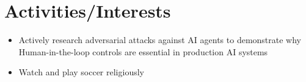 \documentclass[letterpaper,11pt]{article}
\newcommand{\resumeSubHeadingListStart}{\begin{itemize}[leftmargin=*]}
\newcommand{\resumeSubHeadingListEnd}{\end{itemize}}
\begin{document}
\section{Activities/Interests}
  \resumeSubHeadingListStart
    \item{Actively research adversarial attacks against AI agents to demonstrate why Human-in-the-loop controls are essential in production AI systems} \vspace{-8pt}
    \item{Watch and play soccer religiously}\vspace{-1pt}
  \resumeSubHeadingListEnd
\end{document}
